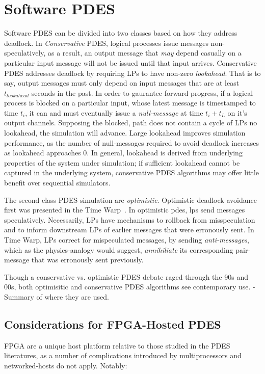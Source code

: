 \section{Software PDES}
Software PDES can be divided into two classes based on how they address
deadlock.  In \emph{Conservative} PDES, logical processes issue messages
non-speculatively, as a result, an output message that \emph{may} depend casually on a
particular input message will not be issued until that input arrives.
Conservative PDES addresses deadlock by requiring LPs to have non-zero
\emph{lookahead}. That is to say, output messages must only depend on input
messages that are at least  $t_{lookahead}$ seconds in the past. In order to gaurantee forward
progress, if a logical process is blocked on a particular input, whose latest
message is timestamped to time $t_{i}$, it can and must eventually issue a
\emph{null-message} at time $t_{i} + t_{L}$ on it's output channels. Supposing
the blocked, path does not contain a cycle of LPs no lookahead, the simulation
will advance.  Large lookahead improves simulation performance, as the number
of null-messages required to avoid deadlock increases as lookahead approaches 0.
In general, lookahead is derived from underlying properties of the system under simulation;
if sufficient lookahead cannot be captured in the underlying system, conservative PDES algorithms may
offer little benefit over sequential simulators.

The second class PDES simulation are \emph{optimistic}. Optimistic deadlock
avoidance first was presented in the Time Warp~\cite{TimeWarp}. In optimistic
pdes, lps send messages speculatively. Necessarily, LPs have mechanisms to
rollback from misspeculation and to inform downstream LPs of earlier messages
that were erronously sent. In Time Warp, LPs correct for mispeculated messages,
by sending \emph{anti-messages}, which as the physics-analogy would suggest,
\emph{annihiliate} its corresponding pair-message that was erronously sent previously.

Though a conservative vs. optimistic PDES debate raged through
the 90s and 00s, both optimisitic and conservative PDES algorithms see
contemporary use.
- Summary of where they are used.


\subsection{Considerations for FPGA-Hosted PDES}

FPGA are a unique host platform relative to those studied in the PDES
literatures, as a number of complications introduced by multiprocessors and
networked-hosts do not apply. Notably:

